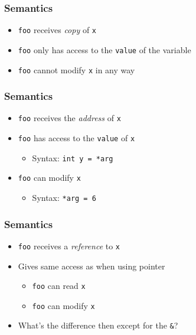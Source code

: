 \begin{frame}
  \frametitle{Semantics}
  \begin{itemize}
    \item {\tt foo} receives \emph{copy} of {\tt x}
    \item {\tt foo} only has access to the {\tt value} of the variable
    \item {\tt foo} cannot modify {\tt x} in any way
  \end{itemize}
\end{frame}

\begin{frame}
  \frametitle{Semantics}
  \begin{itemize}
    \item \texttt{foo} receives the \emph{address} of \texttt{x}
    \item \texttt{foo} has access to the {\tt value} of \texttt{x}
          \begin{itemize}
            \item Syntax: \texttt{int y = *arg}
          \end{itemize}
    \item \texttt{foo} can modify {\tt x}
          \begin{itemize}
            \item Syntax: \texttt{*arg = 6}
          \end{itemize}
  \end{itemize}
\end{frame}

\begin{frame}
  \frametitle{Semantics}
  \begin{itemize}
    \item {\tt foo} receives a \emph{reference} to {\tt x}
    \item Gives same access as when using pointer
          \begin{itemize}
            \item \texttt{foo} can read \texttt{x}
            \item \texttt{foo} can modify \texttt{x}
          \end{itemize}
    \item What's the difference then except for the \texttt{\&}?
  \end{itemize}
\end{frame}

